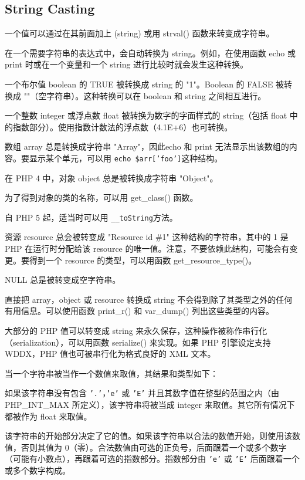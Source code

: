\subsection{String Casting}

一个值可以通过在其前面加上 (string) 或用 strval() 函数来转变成字符串。

在一个需要字符串的表达式中，会自动转换为 string。例如，在使用函数 echo 或 print 时或在一个变量和一个 string 进行比较时就会发生这种转换。

一个布尔值 boolean 的 TRUE 被转换成 string 的 "1"。Boolean 的 FALSE 被转换成 ""（空字符串）。这种转换可以在 boolean 和 string 之间相互进行。

一个整数 integer 或浮点数 float 被转换为数字的字面样式的 string（包括 float 中的指数部分）。使用指数计数法的浮点数（4.1E+6）也可转换。

数组 array 总是转换成字符串 "Array"，因此echo 和 print 无法显示出该数组的内容。要显示某个单元，可以用 \texttt{echo \$arr['foo']}这种结构。


\begin{compactitem}
\item 在 PHP 4 中，对象 object 总是被转换成字符串 "Object"。
\item 为了得到对象的类的名称，可以用 get\_class() 函数。
\item 自 PHP 5 起，适当时可以用 \texttt{\_\_toString}方法。
\end{compactitem}


资源 resource 总会被转变成 "Resource id \#1" 这种结构的字符串，其中的 1 是 PHP 在运行时分配给该 resource 的唯一值。注意，不要依赖此结构，可能会有变更。要得到一个 resource 的类型，可以用函数 get\_resource\_type()。

NULL 总是被转变成空字符串。

直接把 array，object 或 resource 转换成 string 不会得到除了其类型之外的任何有用信息。可以使用函数 print\_r() 和 var\_dump() 列出这些类型的内容。

大部分的 PHP 值可以转变成 string 来永久保存，这种操作被称作串行化（serialization），可以用函数 serialize() 来实现。如果 PHP 引擎设定支持 WDDX，PHP 值也可被串行化为格式良好的 XML 文本。

当一个字符串被当作一个数值来取值，其结果和类型如下：

\begin{compactitem}
\item 如果该字符串没有包含 \texttt{'.'}，\texttt{'e'} 或 \texttt{'E'} 并且其数字值在整型的范围之内（由 PHP\_INT\_MAX 所定义），该字符串将被当成 integer 来取值。其它所有情况下都被作为 float 来取值。

\item 该字符串的开始部分决定了它的值。如果该字符串以合法的数值开始，则使用该数值，否则其值为 0（零）。合法数值由可选的正负号，后面跟着一个或多个数字（可能有小数点），再跟着可选的指数部分。指数部分由 \texttt{'e'} 或 \texttt{'E'} 后面跟着一个或多个数字构成。
\end{compactitem}




